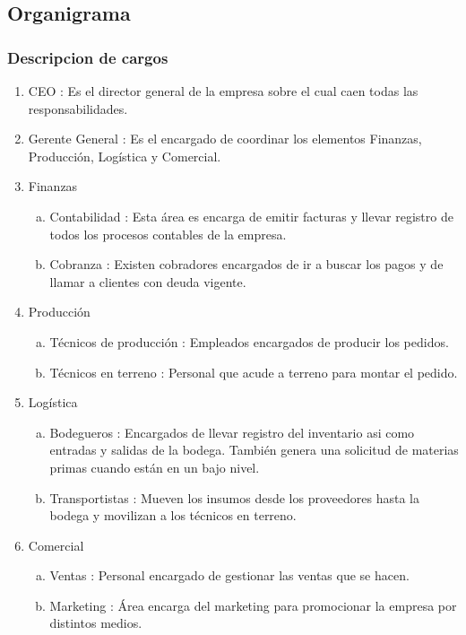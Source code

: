 	\subsection{Organigrama}
		\subsubsection{Descripcion de cargos}
    \begin{enumerate}
    \item CEO :	Es el director general de la empresa sobre el cual caen todas las responsabilidades.
    \item Gerente General : Es el encargado de coordinar los elementos Finanzas, Producción, Logística y Comercial.
    \item Finanzas
    \begin{enumerate}[a)]
        \item Contabilidad : Esta área es encarga de emitir facturas y llevar registro de todos los procesos contables de la empresa.
        \item Cobranza : Existen cobradores encargados de ir a buscar los pagos y de llamar a clientes con deuda vigente.
    \end{enumerate}
    \item Producción
    \begin{enumerate}[a)]
        \item Técnicos de producción : Empleados encargados de producir los pedidos.
        \item Técnicos en terreno : Personal que acude a terreno para montar el pedido.
    \end{enumerate}
    \item Logística
    \begin{enumerate}[a)]
        \item Bodegueros : Encargados de llevar registro del inventario asi como entradas y salidas de la bodega. También genera una solicitud de materias primas cuando están en un bajo nivel.
        \item Transportistas : Mueven los insumos desde los proveedores hasta la bodega y movilizan a los técnicos en terreno.
    \end{enumerate}
    \item Comercial
    \begin{enumerate}[a)]
        \item Ventas : Personal encargado de gestionar las ventas que se hacen.
        \item Marketing : Área encarga del marketing para promocionar la empresa por distintos medios.\newpage
    \end{enumerate}
    \end{enumerate}
